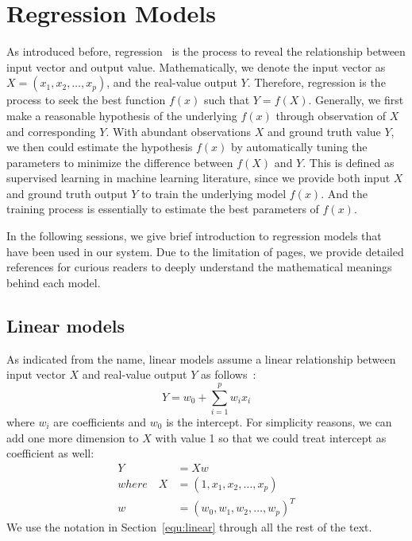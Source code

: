 \section{Regression Models}
\label{sec:method}
As introduced before, regression~\cite{hastie2009elements} is the process to reveal the relationship between input vector and output value.
Mathematically, we denote the input vector as $X = (x_1, x_2, \ldots, x_p)$, and the real-value output $Y$.
Therefore, regression is the process to seek the best function $f(x)$ such that $Y = f(X)$.
Generally, we first make a reasonable hypothesis of the underlying $f(x)$ through observation of $X$ and corresponding $Y$.
With abundant observations $X$ and ground truth value $Y$, we then could estimate the hypothesis $f(x)$ by automatically tuning the parameters to minimize the difference between $f(X)$ and $Y$.
This is defined as supervised learning in machine learning literature, since we provide both input $X$ and ground truth output $Y$ to train the underlying model $f(x)$.
And the training process is essentially to estimate the best parameters of $f(x)$.

In the following sessions, we give brief introduction to regression models that have been used in our system.
Due to the limitation of pages, we provide detailed references for curious readers to deeply understand the mathematical meanings behind each model.

\subsection{Linear models}
\label{sub:linear_models}
As indicated from the name, linear models assume a linear relationship between input vector $X$ and real-value output $Y$ as follows~\cite{hastie2009elements}:
\begin{equation}
	Y = w_0 + \sum\limits_{i=1}^p w_i{x_i}
\end{equation}
where $w_i$ are coefficients and $w_0$ is the intercept. For simplicity reasons, we can add one more dimension to $X$ with value 1 so that we could treat intercept as coefficient as well:
\begin{equation}
	\label{equ:linear}
	\begin{aligned}
		Y &= Xw \\
		where \quad X &= (1, x_1, x_2, \ldots, x_p) \\
		w &= {(w_0, w_1, w_2, \ldots, w_p)}^T
	\end{aligned}
\end{equation}
We use the notation in Section~\ref{equ:linear} through all the rest of the text.

